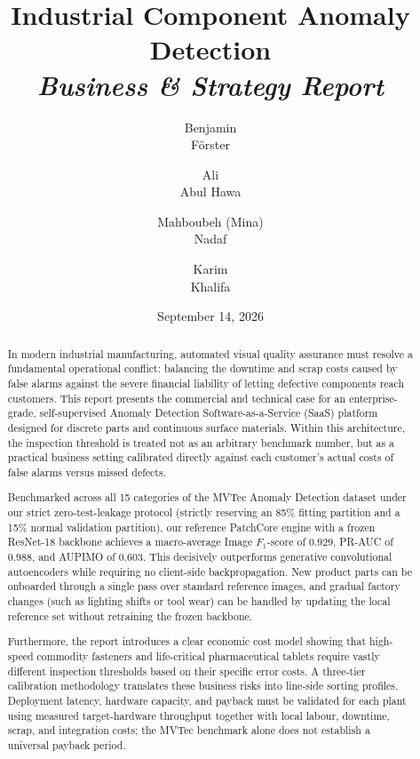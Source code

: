 \documentclass[10pt, a4paper]{article}
\title{
    Industrial Component Anomaly Detection\\
    {\large\textit{Business \& Strategy Report}}
}
\author{
    Benjamin \\ F{\"o}rster \and
    Ali \\ Abul Hawa \and
    Mahboubeh (Mina) \\ Nadaf \and
    Karim \\ Khalifa
}
\date{September 14, 2026}
\begin{document}
\maketitle
\thispagestyle{empty}

\begin{abstract}
\noindent
In modern industrial manufacturing, automated visual quality assurance must resolve a fundamental operational conflict: balancing the downtime and scrap costs caused by false alarms against the severe financial liability of letting defective components reach customers. This report presents the commercial and technical case for an enterprise-grade, self-supervised Anomaly Detection Software-as-a-Service (SaaS) platform designed for discrete parts and continuous surface materials. Within this architecture, the inspection threshold is treated not as an arbitrary benchmark number, but as a practical business setting calibrated directly against each customer's actual costs of false alarms versus missed defects.

Benchmarked across all 15 categories of the MVTec Anomaly Detection dataset under our strict zero-test-leakage protocol (strictly reserving an 85\% fitting partition and a 15\% normal validation partition), our reference PatchCore engine with a frozen ResNet-18 backbone achieves a macro-average Image $F_1$-score of $0.929$, PR-AUC of $0.988$, and AUPIMO of $0.603$. This decisively outperforms generative convolutional autoencoders while requiring no client-side backpropagation. New product parts can be onboarded through a single pass over standard reference images, and gradual factory changes (such as lighting shifts or tool wear) can be handled by updating the local reference set without retraining the frozen backbone.

Furthermore, the report introduces a clear economic cost model showing that high-speed commodity fasteners and life-critical pharmaceutical tablets require vastly different inspection thresholds based on their specific error costs. A three-tier calibration methodology translates these business risks into line-side sorting profiles. Deployment latency, hardware capacity, and payback must be validated for each plant using measured target-hardware throughput together with local labour, downtime, scrap, and integration costs; the MVTec benchmark alone does not establish a universal payback period.
\end{abstract}









\end{document}
